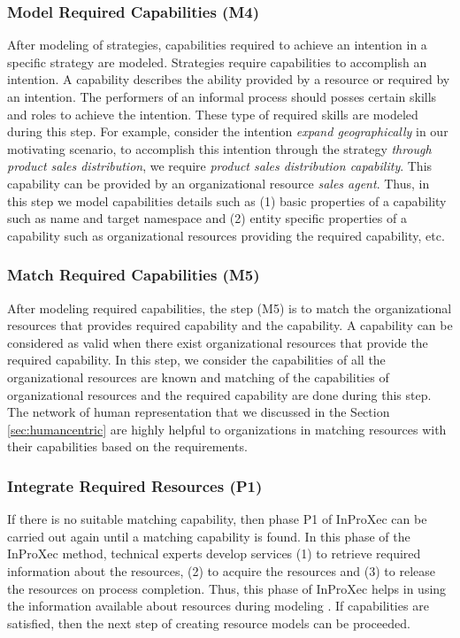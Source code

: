 \subsubsection{Model Required Capabilities (M4)}  
After modeling of strategies, capabilities required to achieve an intention in a specific strategy are modeled. Strategies require capabilities to accomplish an intention. A capability describes the ability provided by a resource or required by an intention. The performers of an informal process should posses certain skills and roles to achieve the intention. These type of required skills are modeled during this step. For example, consider the intention \textit{expand geographically} in our motivating scenario, to accomplish this intention through the strategy \textit{through product sales distribution}, we require \textit{product sales distribution capability}. This capability can be provided by an organizational resource \textit{sales agent}. Thus, in this step we model capabilities details such as (1) basic properties of a capability such as name and target namespace and (2) entity specific properties of a capability such as organizational resources providing the required capability, etc.

\subsubsection{Match Required Capabilities (M5)} 
After modeling required capabilities, the step (M5) is to match the organizational resources that provides required capability and the capability. A capability can be considered as valid when there exist organizational resources that provide the required capability. In this step, we consider the capabilities of all the organizational resources are known and matching of the capabilities of organizational resources and the required capability are done during this step. The network of human representation that we discussed in the Section \ref{sec:humancentric} are highly helpful to organizations in matching resources with their capabilities based on the requirements.

 
\subsubsection{Integrate Required Resources (P1)} 
If there is no suitable matching capability, then phase P1 of InProXec can be carried out again until a matching capability is found. In this phase of the InProXec method, technical experts develop services (1) to retrieve required information about the resources, (2) to acquire the resources and (3) to release the resources on process completion. Thus, this phase of InProXec helps in using the information available about resources during modeling \cite{Sungur2015}. If capabilities are satisfied, then the next step of creating resource models can be proceeded.

